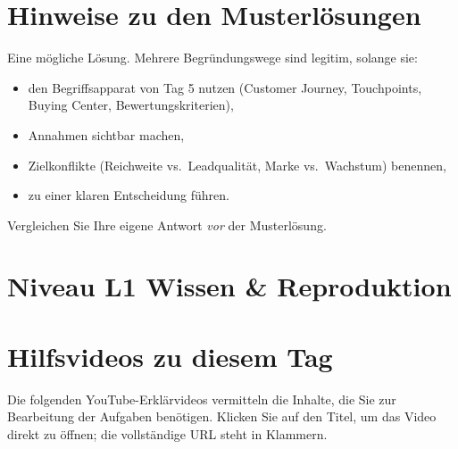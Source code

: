 \documentclass[11pt,a4paper,oneside]{article}
\begin{document}
\section*{Hinweise zu den Musterlösungen}
\thispagestyle{plain}

\noindent Eine mögliche Lösung. Mehrere Begründungswege sind legitim, solange sie:

\begin{itemize}
  \item den Begriffsapparat von Tag 5 nutzen (Customer Journey, Touchpoints, Buying Center, Bewertungskriterien),
  \item Annahmen sichtbar machen,
  \item Zielkonflikte (Reichweite vs.\ Leadqualität, Marke vs.\ Wachstum) benennen,
  \item zu einer klaren Entscheidung führen.
\end{itemize}

\begin{infobox}
Vergleichen Sie Ihre eigene Antwort \emph{vor} der Musterlösung.
\end{infobox}

\clearpage

\section*{Niveau L1 \textendash{} Wissen \& Reproduktion}

\section*{Hilfsvideos zu diesem Tag}
\thispagestyle{plain}

\noindent Die folgenden YouTube-Erkl\"arvideos vermitteln die Inhalte, die Sie zur Bearbeitung der Aufgaben ben\"otigen. Klicken Sie auf den Titel, um das Video direkt zu \"offnen; die vollst\"andige URL steht in Klammern.
\end{document}
